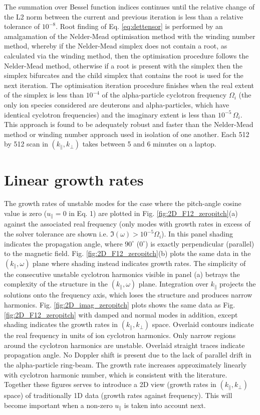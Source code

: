 \documentclass[12pt]{iopart}
\begin{document}
The summation over Bessel function indices continues until the relative change of the L2 norm between the current and previous iteration is less than a relative tolerance of $10^{-8}$. Root finding of Eq. \ref{eq:dettensor} is performed by an amalgamation of the Nelder-Mead\cite{Nelder1965} optimisation method with the winding number method, whereby if the Nelder-Mead simplex does not contain a root, as calculated via the winding method, then the optimisation procedure follows the Nelder-Mead method, otherwise if a root is present with the simplex then the simplex bifurcates and the child simplex that contains the root is used for the next iteration. The optimisation iteration procedure finishes when the real extent of the simplex is less than $10^{-4}$ of the alpha-particle cyclotron frequency $\Omega_i$ (the only ion species considered are deuterons and alpha-particles, which have identical cyclotron frequencies) and the imaginary extent is less than $10^{-5}\,\Omega_i$. This approach is found to be adequately robust and faster than the Nelder-Mead method or winding number approach used in isolation of one another. Each 512 by 512 scan in $(k_\parallel, k_\perp)$ takes between 5 and 6 minutes on a laptop.

\section{Linear growth rates}

The growth rates of unstable modes for the case where the pitch-angle cosine value is zero ($u_\parallel = 0$ in Eq. 1) are plotted in Fig. \ref{fig:2D_F12_zeropitch}(a) against the associated real frequency (only modes with growth rates in excess of the solver tolerance are shown i.e. $\Im(\omega) > 10^{-5} \Omega_i$). In this panel shading indicates the propagation angle, where $90^\circ$ ($0^\circ$) is exactly perpendicular (parallel) to the magnetic field. Fig. \ref{fig:2D_F12_zeropitch}(b) plots the same data in the $(k_\parallel,\omega)$ plane where shading instead indicates growth rates. The simplicity of the consecutive unstable cyclotron harmonics visible in panel (a) betrays the complexity of the structure in the $(k_\parallel, \omega)$ plane. Integration over $k_\parallel$ projects the solutions onto the frequency axis, which loses the structure and produces narrow harmonics. Fig. \ref{fig:2D_imag_zeropitch} plots shows the same data as Fig. \ref{fig:2D_F12_zeropitch} with damped and normal modes in addition, except shading indicates the growth rates in $(k_\parallel, k_\perp)$ space. Overlaid contours indicate the real frequency in units of ion cyclotron harmonics. Only narrow regions around the cyclotron harmonics are unstable. Overlaid straight traces indicate propagation angle. No Doppler shift is present due to the lack of parallel drift in the alpha-particle ring-beam. The growth rate increases approximately linearly with cyclotron harmonic number, which is consistent with the literature\cite{Dendy1994}. Together these figures serves to introduce a 2D view (growth rates in $(k_\parallel, k_\perp)$ space) of traditionally 1D data (growth rates against frequency). This will become important when a non-zero $u_\parallel$ is taken into account next.
\end{document}
